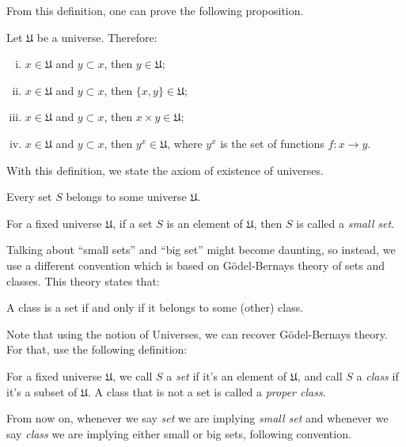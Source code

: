 From this definition, one can prove the following proposition.
\begin{proposition}
	Let $\mathfrak U$ be a universe. Therefore:
	\begin{enumerate}[(i)]
		\item $x \in \mathfrak U$ and $y \subset x$, then $y \in \mathfrak U$;
		\item $x \in \mathfrak U$ and $y \subset x$, then $\{x,y\} \in \mathfrak U$;
		\item $x \in \mathfrak U$ and $y \subset x$, then $x\times y \in \mathfrak U$;
		\item $x \in \mathfrak U$ and $y \subset x$, then $y^x \in \mathfrak U$, where $y^x$ is the set of functions $f:x \to y$.
	\end{enumerate}
	\label{prop:universe}
\end{proposition}

With this definition, we state the axiom of existence of universes.

\begin{axiom}
	Every set $S$ belongs to some universe $\mathfrak U$.
\end{axiom}

\begin{definition}
	For a fixed universe $\mathfrak U$, if a set $S$ is an element of $\mathfrak U$,
	then $S$ is called a \textit{small set}.
\end{definition}

Talking about ``small sets'' and ``big set'' might become daunting, so instead, we
use a different convention which is based on Gödel-Bernays theory of sets and classes.
This theory states that:
\begin{axiom}
	A class is a set if and only if it belongs to some (other)
	class.
	\label{axiom:gb}
\end{axiom}

Note that using the notion of Universes, we can recover Gödel-Bernays theory. For that,
use the following definition:
\begin{definition}
	For a fixed universe $\mathfrak U$, we call $S$ a \textit{set} if it's an element
	of $\mathfrak U$, and call $S$ a \textit{class} if it's a subset of $\mathfrak U$.
	A class that is not a set is called a \textit{proper class}.
\end{definition}

From now on, whenever we say \textit{set} we are implying \textit{small set}
and whenever we say \textit{class} we are implying either small or big sets,
following \citet{borceux1994handbook} convention.


